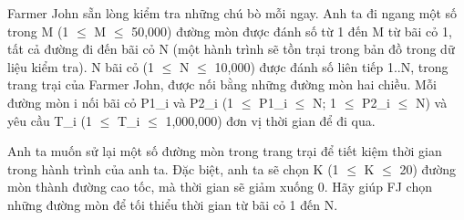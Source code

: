Farmer John sẵn lòng kiểm tra những chú bò mỗi ngay. Anh ta đi ngang một số  trong M (1  $\le$  M  $\le$  50,000) đường mòn được đánh số từ 1 đến M từ bãi cỏ 1, tất  cả đường đi đến bãi cỏ N (một hành trình sẽ tồn trại trong bản đồ trong dữ  liệu kiểm tra). N bãi cỏ (1  $\le$  N  $\le$  10,000) được đánh số liên tiếp 1..N, trong  trang trại của Farmer John, được nối bằng những đường mòn hai chiều. Mỗi đường  mòn i nối bãi cỏ P1\_i và P2\_i (1  $\le$  P1\_i  $\le$  N; 1  $\le$  P2\_i  $\le$  N) và yêu cầu T\_i  (1  $\le$  T\_i  $\le$  1,000,000) đơn vị thời gian để đi qua.  

   Anh ta muốn sử lại một số đường mòn trong trang trại để tiết kiệm thời gian trong  hành trình của anh ta. Đặc biệt, anh ta sẽ chọn K (1  $\le$  K  $\le$  20) đường mòn thành  đường cao tốc, mà thời gian sẽ giảm xuống 0. Hãy giúp FJ chọn những đường mòn để  tối thiểu thời gian từ bãi cỏ 1 đến N.  

\
